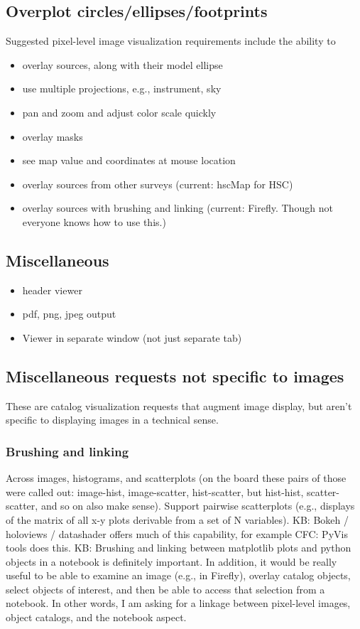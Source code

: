 \subsection{Overplot circles/ellipses/footprints}
Suggested pixel-level image visualization requirements include the ability to
\begin{itemize}
\item{overlay sources, along with their model ellipse}
\item{use multiple projections, e.g., instrument, sky}
\item{pan and zoom and adjust color scale quickly}
\item{overlay masks}
\item{see map value and coordinates at mouse location}
\item{overlay sources from other surveys (current: hscMap for HSC)}
\item{overlay sources with brushing and linking (current: Firefly. Though not everyone knows how to use this.)}
\end{itemize}

\subsection{Miscellaneous}
\begin{itemize}
\item{header viewer}
\item{pdf, png, jpeg output}
\item{Viewer in separate window (not just separate tab)}
\end{itemize}

\subsection{Miscellaneous requests not specific to images}
These are catalog visualization requests that augment image display, but aren't specific to displaying images in a technical sense.

\subsubsection{Brushing and linking}
Across images, histograms, and scatterplots (on the board these pairs of those were called out: image-hist, image-scatter, hist-scatter, but hist-hist, scatter-scatter, and so on also make sense). Support pairwise scatterplots (e.g., displays of the matrix of all x-y plots derivable from a set of N variables).
KB: Bokeh / holoviews / datashader offers much of this capability, for example
CFC: PyVis tools does this.
KB: Brushing and linking between matplotlib plots and python objects in a notebook is definitely important. In addition, it would be really useful to be able to examine an image (e.g., in Firefly), overlay catalog objects, select objects of interest, and then be able to access that selection from a notebook. In other words, I am asking for a linkage between pixel-level images, object catalogs, and the notebook aspect.

